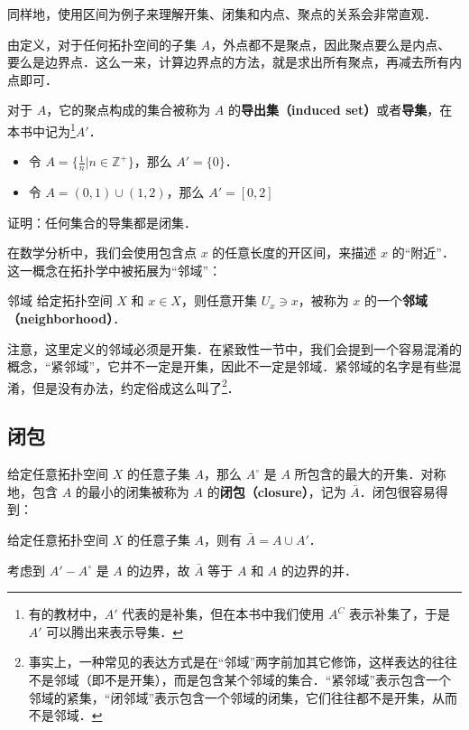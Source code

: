 同样地，使用区间为例子来理解开集、闭集和内点、聚点的关系会非常直观．

由定义，对于任何拓扑空间的子集 $A$，外点都不是聚点，因此聚点要么是内点、要么是边界点．这么一来，计算边界点的方法，就是求出所有聚点，再减去所有内点即可．

对于 $A$，它的聚点构成的集合被称为 $A$ 的\textbf{导出集（induced set）}或者\textbf{导集}，在本书中记为\footnote{有的教材中，$A'$ 代表的是补集，但在本书中我们使用 $A^C$ 表示补集了，于是 $A'$ 可以腾出来表示导集．}$A'$．

\begin{example}{}
\begin{itemize}
\item 令 $A=\{\frac{1}{n}|n\in\mathbb{Z}^+\}$，那么 $A'=\{0\}$．
\item 令 $A=(0,1)\cup(1,2)$，那么 $A'=[0,2]$
\end{itemize}
\end{example}

\begin{exercise}{}
证明：任何集合的导集都是闭集．
\end{exercise}

在数学分析中，我们会使用包含点 $x$ 的任意长度的开区间，来描述 $x$ 的“附近”．这一概念在拓扑学中被拓展为“邻域”：

\begin{definition}{邻域}
给定拓扑空间 $X$ 和 $x\in X$，则任意开集 $U_x\ni x$，被称为 $x$ 的一个\textbf{邻域（neighborhood）}．
\end{definition}

注意，这里定义的邻域必须是开集．在紧致性一节中，我们会提到一个容易混淆的概念，“紧邻域”，它并不一定是开集，因此不一定是邻域．紧邻域的名字是有些混淆，但是没有办法，约定俗成这么叫了\footnote{事实上，一种常见的表达方式是在“邻域”两字前加其它修饰，这样表达的往往不是邻域（即不是开集），而是包含某个邻域的集合．“紧邻域”表示包含一个邻域的紧集，“闭邻域”表示包含一个邻域的闭集，它们往往都不是开集，从而不是邻域．}．



\subsection{闭包}

给定任意拓扑空间 $X$ 的任意子集 $A$，那么 $A^\circ$ 是 $A$ 所包含的最大的开集．对称地，包含 $A$ 的最小的闭集被称为 $A$ 的\textbf{闭包（closure）}，记为 $\bar{A}$．闭包很容易得到：

\begin{theorem}{}
给定任意拓扑空间 $X$ 的任意子集 $A$，则有 $\bar{A}=A\cup A'$．
\end{theorem}
\begin{corollary}{}\label{Topo0_cor1}
考虑到 $A'-A^\circ$ 是 $A$ 的边界，故 $\bar{A}$ 等于 $A$ 和 $A$ 的边界的并．
\end{corollary}


